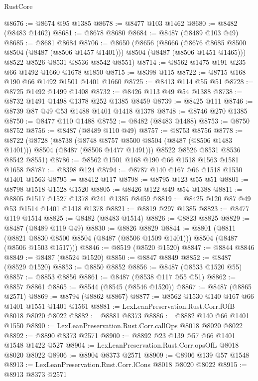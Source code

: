 \begin{lexlean}{RustCore}
\begin{coremodule}
@8676 := @8674 @95 @1385
@8678 := @8477 @103 @1462
@8680 := @8482 (@8483 @1462)
@8681 := @8678 @8680
@8684 := @8487 (@8489 @103 @49)
@8685 := @8681 @8684
@8706 := @8650
    (@8656
      (@8666
        (@8676 @8685 @8500 @8504 (@8487 (@8506 @1457 @1401)))
        @8504
        (@8487 (@8506 @1451 @1465)))
      @8522
      @8526
      @8531
      @8536
      @8542
      @8551)
@8714 := @8562 @1475 @191 @235 @66 @1492 @1660 @1678 @1850
@8715 := @8398 @115
@8722 := @8715 @168 @190 @66 @1492 @1501 @1401 @1660
@8725 := @8413 @114 @55 @51
@8728 := @8725 @1492 @1499 @1408
@8732 := @8426 @113 @49 @54 @1388
@8738 := @8732 @1491 @1498 @1378 @252 @1385 @8459
@8739 := @8425 @111
@8746 := @8739 @87 @49 @53 @1488 @1401 @1418 @1378
@8748 := @8746 @270 @1385
@8750 := @8477 @110 @1488
@8752 := @8482 (@8483 @1488)
@8753 := @8750 @8752
@8756 := @8487 (@8489 @110 @49)
@8757 := @8753 @8756
@8778 := @8722
    (@8728
      (@8738
        (@8748 @8757 @8500 @8504 (@8487 (@8506 @1483 @1401)))
        @8504
        (@8487 (@8506 @1477 @1491)))
      @8522
      @8526
      @8531
      @8536
      @8542
      @8551)
@8786 := @8562 @1501 @168 @190 @66 @1518 @1563 @1581 @1658
@8787 := @8398 @124
@8794 := @8787 @140 @167 @66 @1518 @1530 @1401 @1563
@8795 := @8412 @117
@8798 := @8795 @123 @55 @51
@8801 := @8798 @1518 @1528 @1520
@8805 := @8426 @122 @49 @54 @1388
@8811 := @8805 @1517 @1527 @1378 @241 @1385 @8459
@8819 := @8425 @120 @87 @49 @53 @1514 @1401 @1418 @1378
@8821 := @8819 @297 @1385
@8823 := @8477 @119 @1514
@8825 := @8482 (@8483 @1514)
@8826 := @8823 @8825
@8829 := @8487 (@8489 @119 @49)
@8830 := @8826 @8829
@8844 := @8801
    (@8811 (@8821 @8830 @8500 @8504 (@8487 (@8506 @1509 @1401))) @8504 (@8487 (@8506 @1503 @1517)))
@8846 := @8519 (@8520 @1520)
@8847 := @8844 @8846
@8849 := @8487 (@8524 @1520)
@8850 := @8847 @8849
@8852 := @8487 (@8529 @1520)
@8853 := @8850 @8852
@8856 := @8487 (@8533 @1520 @55)
@8857 := @8853 @8856
@8861 := @8487 (@8538 @117 @55 @51)
@8862 := @8857 @8861
@8865 := @8544 (@8545 (@8546 @1520))
@8867 := @8487 (@8865 @2571)
@8869 := @8794 (@8862 @8867)
@8877 := @8562 @1530 @140 @167 @66 @1401 @1551 @1401 @1561
@8881 := LexLeanPreservation.Rust.Corr.fOfB @8018 @8020 @8022
@8882 := @8881 @8373
@8886 := @8882 @140 @66 @1401 @1550
@8890 := LexLeanPreservation.Rust.Corr.callOps @8018 @8020 @8022
@8892 := @8890 @8373 @2571
@8900 := @8892 @23 @139 @57 @66 @1401 @1548 @1422 @527
@8904 := LexLeanPreservation.Rust.Corr.opsOfL @8018 @8020 @8022
@8906 := @8904 @8373 @2571
@8909 := @8906 @139 @57 @1548
@8913 := LexLeanPreservation.Rust.Corr.lCons @8018 @8020 @8022
@8915 := @8913 @8373 @2571

\end{coremodule}
\end{lexlean}

